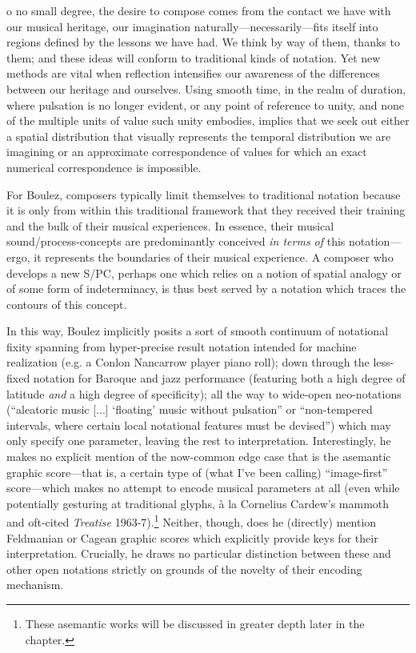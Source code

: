        \begin{smallquote}
            [T]o no small degree, the desire to compose comes from the contact we have with our musical heritage, our imagination naturally---necessarily---fits itself into regions defined by the lessons we have had. We think by way of them, thanks to them; and these ideas will conform to traditional kinds of notation. Yet new methods are vital when reflection intensifies our awareness of the differences between our heritage and ourselves. Using smooth time, in the realm of duration, where pulsation is no longer evident, or any point of reference to unity, and none of the multiple units of value such unity embodies, implies that we seek out either a spatial distribution that visually represents the temporal distribution we are imagining or an approximate correspondence of values for which an exact numerical correspondence is impossible.\autocite[531]{Boulez_Nattiez_2019}
        \end{smallquote}

    \noindent For Boulez, composers typically limit themselves to traditional notation because it is only from within this traditional framework that they received their training and the bulk of their musical experiences. In essence, their musical sound/process-concepts are predominantly conceived \textit{in terms of} this notation---ergo, it represents the boundaries of their musical experience. A composer who develops a new S/PC, perhaps one which relies on a notion of spatial analogy or of some form of indeterminacy, is thus best served by a notation which traces the contours of this concept.
    
    In this way, Boulez implicitly posits a sort of smooth continuum of notational fixity spanning from hyper-precise result notation intended for machine realization (e.g. a Conlon Nancarrow player piano roll); down through the less-fixed notation for Baroque and jazz performance (featuring both a high degree of latitude \textit{and} a high degree of specificity); all the way to wide-open neo-notations (``aleatoric music [...] `floating' music without pulsation'' or ``non-tempered intervals, where certain local notational features must be devised'') which may only specify one parameter, leaving the rest to interpretation.\autocite[53f6]{Boulez_Nattiez_2019} Interestingly, he makes no explicit mention of the now-common edge case that is the asemantic graphic score---that is, a certain type of (what I've been calling) ``image-first'' score---which makes no attempt to encode musical parameters at all (even while potentially gesturing at traditional glyphs, à la Cornelius Cardew's mammoth and oft-cited \textit{Treatise} 1963-7).\footnote{These asemantic works will be discussed in greater depth later in the chapter.} Neither, though, does he (directly) mention Feldmanian or Cagean graphic scores which explicitly provide keys for their interpretation. Crucially, he draws no particular distinction between these and other open notations strictly on grounds of the novelty of their encoding mechanism. 

